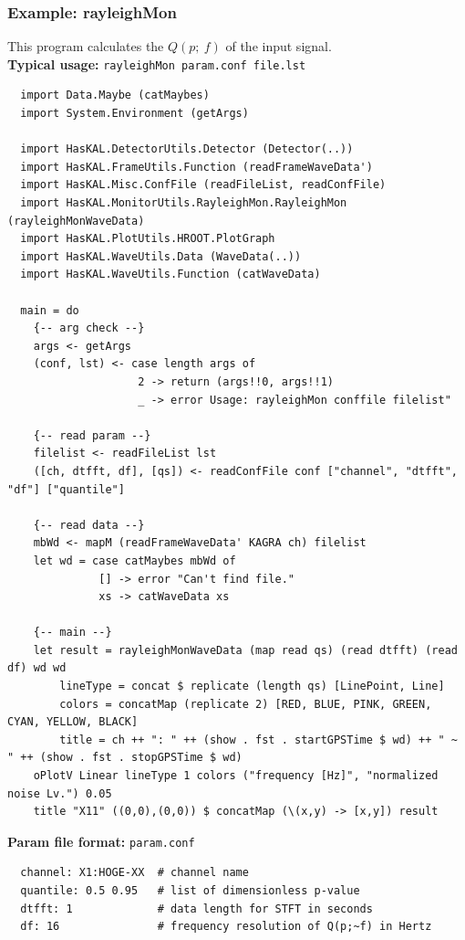 \subsubsection{{\bf Example:} rayleighMon}
This program calculates the $Q(p;~f)$ of the input signal.\\

{\noindent \bf Typical usage:} {\tt rayleighMon param.conf file.lst}
{\footnotesize
\begin{verbatim}
  import Data.Maybe (catMaybes)
  import System.Environment (getArgs)

  import HasKAL.DetectorUtils.Detector (Detector(..))
  import HasKAL.FrameUtils.Function (readFrameWaveData')
  import HasKAL.Misc.ConfFile (readFileList, readConfFile)
  import HasKAL.MonitorUtils.RayleighMon.RayleighMon (rayleighMonWaveData)
  import HasKAL.PlotUtils.HROOT.PlotGraph
  import HasKAL.WaveUtils.Data (WaveData(..))
  import HasKAL.WaveUtils.Function (catWaveData)

  main = do
    {-- arg check --}
    args <- getArgs
    (conf, lst) <- case length args of
                    2 -> return (args!!0, args!!1)
                    _ -> error Usage: rayleighMon conffile filelist"

    {-- read param --}
    filelist <- readFileList lst
    ([ch, dtfft, df], [qs]) <- readConfFile conf ["channel", "dtfft", "df"] ["quantile"]

    {-- read data --}
    mbWd <- mapM (readFrameWaveData' KAGRA ch) filelist
    let wd = case catMaybes mbWd of
              [] -> error "Can't find file."
              xs -> catWaveData xs

    {-- main --}
    let result = rayleighMonWaveData (map read qs) (read dtfft) (read df) wd wd
        lineType = concat $ replicate (length qs) [LinePoint, Line]
        colors = concatMap (replicate 2) [RED, BLUE, PINK, GREEN, CYAN, YELLOW, BLACK]
        title = ch ++ ": " ++ (show . fst . startGPSTime $ wd) ++ " ~ " ++ (show . fst . stopGPSTime $ wd)
    oPlotV Linear lineType 1 colors ("frequency [Hz]", "normalized noise Lv.") 0.05
    title "X11" ((0,0),(0,0)) $ concatMap (\(x,y) -> [x,y]) result

\end{verbatim}
}


{\noindent \bf Param file format:} {\tt param.conf}
{\footnotesize
\begin{verbatim}
  channel: X1:HOGE-XX  # channel name
  quantile: 0.5 0.95   # list of dimensionless p-value
  dtfft: 1             # data length for STFT in seconds
  df: 16               # frequency resolution of Q(p;~f) in Hertz

\end{verbatim}
}


